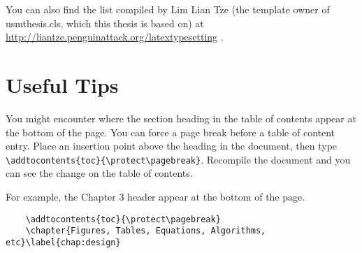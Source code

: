 You can also find the list compiled by Lim Lian Tze (the template owner of usmthesis.cls, which this thesis is based on) at \url{http://liantze.penguinattack.org/latextypesetting} \citep{lim:latextypesetting}.

\section{Useful Tips} %
You might encounter where the section heading in the table of contents appear at the bottom of the page. You can force a page break before a table of content entry. Place an insertion point above the heading in the document, then type \verb|\addtocontents{toc}{\protect\pagebreak}|. Recompile the document and you can see the change on the table of contents.

\noindent For example, the Chapter 3 header appear at the bottom of the page. 

\begin{lstlisting}
	\addtocontents{toc}{\protect\pagebreak}
	\chapter{Figures, Tables, Equations, Algorithms, etc}\label{chap:design}
\end{lstlisting}
	